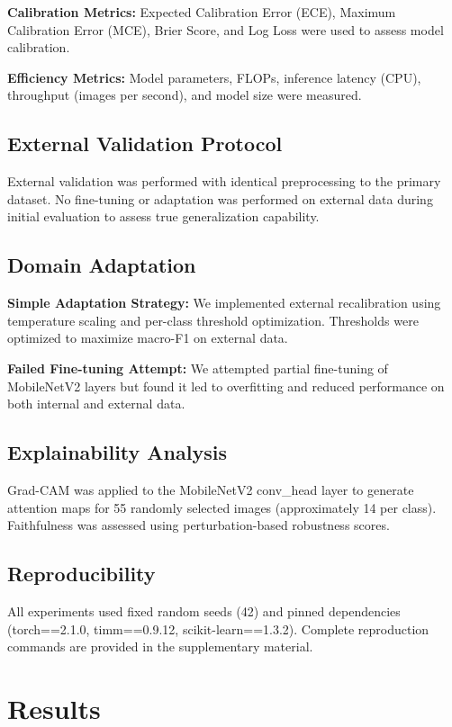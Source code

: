 \documentclass[11pt]{article}
\begin{document}
\textbf{Calibration Metrics:} Expected Calibration Error (ECE), Maximum Calibration Error (MCE), Brier Score, and Log Loss were used to assess model calibration.

\textbf{Efficiency Metrics:} Model parameters, FLOPs, inference latency (CPU), throughput (images per second), and model size were measured.

\subsection{External Validation Protocol}

External validation was performed with identical preprocessing to the primary dataset. No fine-tuning or adaptation was performed on external data during initial evaluation to assess true generalization capability.

\subsection{Domain Adaptation}

\textbf{Simple Adaptation Strategy:} We implemented external recalibration using temperature scaling and per-class threshold optimization. Thresholds were optimized to maximize macro-F1 on external data.

\textbf{Failed Fine-tuning Attempt:} We attempted partial fine-tuning of MobileNetV2 layers but found it led to overfitting and reduced performance on both internal and external data.

\subsection{Explainability Analysis}

Grad-CAM was applied to the MobileNetV2 conv\_head layer to generate attention maps for 55 randomly selected images (approximately 14 per class). Faithfulness was assessed using perturbation-based robustness scores.

\subsection{Reproducibility}

All experiments used fixed random seeds (42) and pinned dependencies (torch==2.1.0, timm==0.9.12, scikit-learn==1.3.2). Complete reproduction commands are provided in the supplementary material.

\section{Results}
\end{document}
